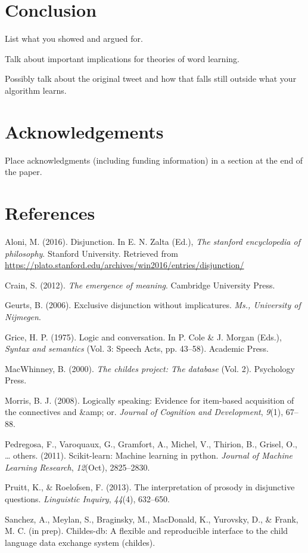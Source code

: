 \documentclass[10pt, letterpaper]{article}
\begin{document}
\section{Conclusion}\label{conclusion}

List what you showed and argued for.

Talk about important implications for theories of word learning.

Possibly talk about the original tweet and how that falls still outside
what your algorithm learns.

\section{Acknowledgements}\label{acknowledgements}

Place acknowledgments (including funding information) in a section at
the end of the paper.

\section{References}\label{references}

\setlength{\parindent}{-0.1in} \setlength{\leftskip}{0.125in} \noindent

\hypertarget{refs}{}
\hypertarget{ref-Aloni2016}{}
Aloni, M. (2016). Disjunction. In E. N. Zalta (Ed.), \emph{The stanford
encyclopedia of philosophy}. Stanford University. Retrieved from
\url{https://plato.stanford.edu/archives/win2016/entries/disjunction/}

\hypertarget{ref-crain2012emergence}{}
Crain, S. (2012). \emph{The emergence of meaning}. Cambridge University
Press.

\hypertarget{ref-geurts2006exclusive}{}
Geurts, B. (2006). Exclusive disjunction without implicatures.
\emph{Ms., University of Nijmegen}.

\hypertarget{ref-grice1975logicconvo}{}
Grice, H. P. (1975). Logic and conversation. In P. Cole \& J. Morgan
(Eds.), \emph{Syntax and semantics} (Vol. 3: Speech Acts, pp. 43--58).
Academic Press.

\hypertarget{ref-macwhinney2000childes}{}
MacWhinney, B. (2000). \emph{The childes project: The database} (Vol.
2). Psychology Press.

\hypertarget{ref-morris2008logically}{}
Morris, B. J. (2008). Logically speaking: Evidence for item-based
acquisition of the connectives and \&amp; or. \emph{Journal of Cognition
and Development}, \emph{9}(1), 67--88.

\hypertarget{ref-pedregosa2011scikit}{}
Pedregosa, F., Varoquaux, G., Gramfort, A., Michel, V., Thirion, B.,
Grisel, O., \ldots{} others. (2011). Scikit-learn: Machine learning in
python. \emph{Journal of Machine Learning Research}, \emph{12}(Oct),
2825--2830.

\hypertarget{ref-pruitt2013interpretation}{}
Pruitt, K., \& Roelofsen, F. (2013). The interpretation of prosody in
disjunctive questions. \emph{Linguistic Inquiry}, \emph{44}(4),
632--650.

\hypertarget{ref-childesdb}{}
Sanchez, A., Meylan, S., Braginsky, M., MacDonald, K., Yurovsky, D., \&
Frank, M. C. (in prep). Childes-db: A flexible and reproducible
interface to the child language data exchange system (childes).
\end{document}
